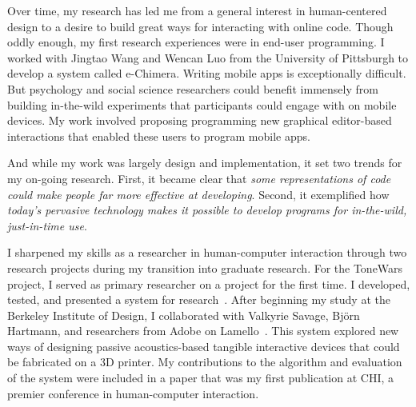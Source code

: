 \documentclass[12pt]{memoir}
\begin{document}



Over time, my research has led me from a general interest in human-centered design to a desire to build great ways for interacting with online code.
Though oddly enough, my first research experiences were in end-user programming.
I worked with Jingtao Wang and Wencan Luo from the University of Pittsburgh to develop a system called e-Chimera.
Writing mobile apps is exceptionally difficult.
But psychology and social science researchers could benefit immensely from building in-the-wild experiments that participants could engage with on mobile devices.
My work involved proposing programming new graphical editor-based interactions that enabled these users to program mobile apps.

And while my work was largely design and implementation, it set two trends for my on-going research.
First, it became clear that \emph{some representations of code could make people far more effective at developing}.
Second, it exemplified how \emph{today's pervasive technology makes it possible to develop programs for in-the-wild, just-in-time use}.

I sharpened my skills as a researcher in human-computer interaction through two research projects during my transition into graduate research.
For the ToneWars project, I served as primary researcher on a project for the first time.
I developed, tested, and presented a system for research~\cite{head_tonewars_2014}.
After beginning my study at the Berkeley Institute of Design, I collaborated with Valkyrie Savage, Bj\"{o}rn Hartmann, and researchers from Adobe on Lamello~\cite{savage_lamello_2015}.
This system explored new ways of designing passive acoustics-based tangible interactive devices that could be fabricated on a 3D printer.
My contributions to the algorithm and evaluation of the system were included in a paper that was my first publication at CHI, a premier conference in human-computer interaction.
\end{document}
